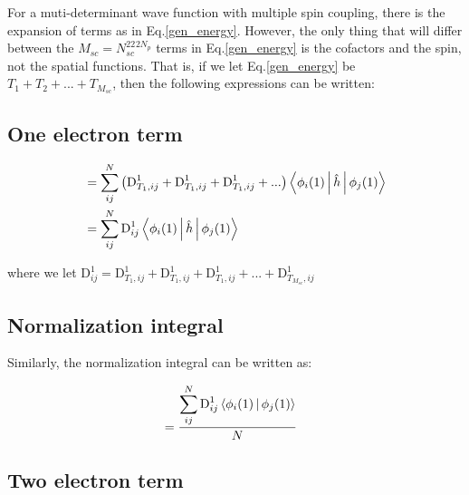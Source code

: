 \documentclass[a4paper]{article}
\begin{document}
For a muti-determinant wave function with multiple spin coupling, there is the expansion of terms as in  Eq.\ref{gen_energy}. However, the only thing that will differ between the $M_{sc} = {N_{sc}^22^{2N_p}}$ terms in Eq.\ref{gen_energy} is the cofactors and the spin, not the spatial functions. 
That is, if we let Eq.\ref{gen_energy} be $T_1 + T_2 + ...+T_{M_{sc}}$, then the following expressions can be written:

\subsection{One electron term}

 \begin{equation}
 \begin{aligned}                                                                                                                            
 &=  \displaystyle \sum_{ij}^{N}  \big( \text{D}_{T_1, ij}^1 + \text{D}_{T_1, ij}^1 + \text{D}_{T_1, ij}^1 +...\big) \Braket{ \phi_{i}(1)  | \hat{h}| \phi_{j}(1)  }   \\                                                                                                                                
 &=  \displaystyle \sum_{ij}^{N}  \text{D}_{ij}^1 \Braket{ \phi_{i}(1)  | \hat{h}| \phi_{j}(1)  } 
 \label{total_onee}
     \end{aligned}
     \end{equation}

where we let $\text{D}_{ij}^1 = \text{D}_{T_1, ij}^1 + \text{D}_{T_1, ij}^1 + \text{D}_{T_1, ij}^1 +...+\text{D}_{T_{M_{sc}}, ij}^1$

\subsection{Normalization integral}

Similarly, the normalization integral can be written as:

 \begin{equation}
 \begin{aligned}                                                                                                                          
 &=  \frac{\displaystyle \sum_{ij}^{N}  \text{D}_{ij}^1 \Braket{ \phi_{i}(1)  |  \phi_{j}(1)  }}{N} 
 \label{total_norm}
     \end{aligned}
     \end{equation}

\subsection{Two electron term}
\end{document}
